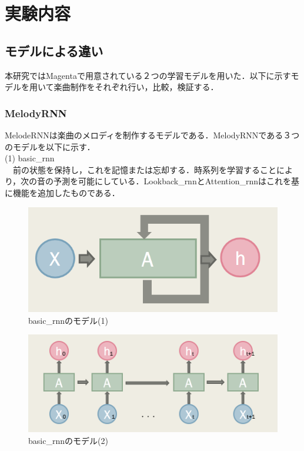 \chapter{実験内容}
\section{モデルによる違い}
本研究ではMagentaで用意されている２つの学習モデルを用いた．以下に示すモデルを用いて楽曲制作をそれぞれ行い，比較，検証する．
\subsection{MelodyRNN}
MelodeRNNは楽曲のメロディを制作するモデルである．MelodyRNNである３つのモデルを以下に示す．\\
(1) basic\_rnn\\
　前の状態を保持し，これを記憶または忘却する．時系列を学習することにより，次の音の予測を可能にしている．Lookback\_rnnとAttention\_rnnはこれを基に機能を追加したものである．
\begin{figure}[!ht]
    \begin{screen}
    \begin{center}
        \includegraphics[scale=1.4,clip]{./img/basic3.png}
        \caption{basic\_rnnのモデル(1)}
        \label{fig:basicrnnのモデル(1)}
    \end{center}
    \end{screen}
\end{figure}
\newpage
\begin{figure}[!ht]
    \begin{screen}
    \begin{center}
        \includegraphics[scale=0.9,clip]{./img/basic4.png}
        \caption{basic\_rnnのモデル(2)}
        \label{fig:basic_rnnのモデル(2)}
    \end{center}
    \end{screen}
\end{figure}
